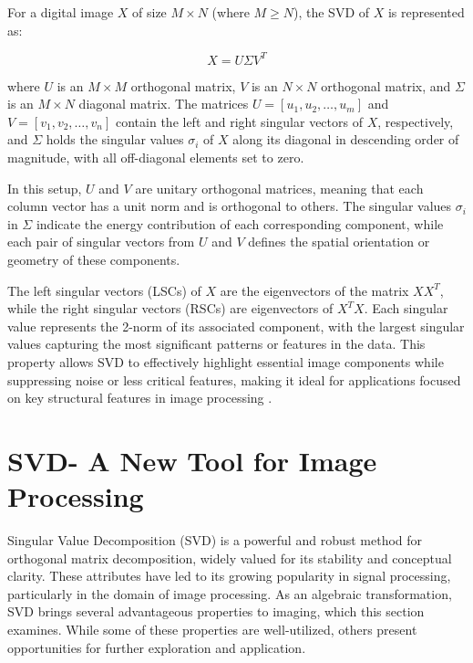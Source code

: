 \documentclass[
  journal,
]{IEEEtran}%
\begin{document}
For a digital image \(X\) of size \(M \times N\) (where \(M \geq N\)),
the SVD of \(X\) is represented as:

\[
X = U \Sigma V^T
\]

where \(U\) is an \(M \times M\) orthogonal matrix, \(V\) is an
\(N \times N\) orthogonal matrix, and \(\Sigma\) is an \(M \times N\)
diagonal matrix. The matrices \(U = [u_1, u_2, \ldots, u_m]\) and
\(V = [v_1, v_2, \ldots, v_n]\) contain the left and right singular
vectors of \(X\), respectively, and \(\Sigma\) holds the singular values
\(\sigma_i\) of \(X\) along its diagonal in descending order of
magnitude, with all off-diagonal elements set to zero.

In this setup, \(U\) and \(V\) are unitary orthogonal matrices, meaning
that each column vector has a unit norm and is orthogonal to others. The
singular values \(\sigma_i\) in \(\Sigma\) indicate the energy
contribution of each corresponding component, while each pair of
singular vectors from \(U\) and \(V\) defines the spatial orientation or
geometry of these components.

The left singular vectors (LSCs) of \(X\) are the eigenvectors of the
matrix \(X X^T\), while the right singular vectors (RSCs) are
eigenvectors of \(X^T X\). Each singular value represents the 2-norm of
its associated component, with the largest singular values capturing the
most significant patterns or features in the data. This property allows
SVD to effectively highlight essential image components while
suppressing noise or less critical features, making it ideal for
applications focused on key structural features in image processing
.

\section{SVD- A New Tool for Image
Processing}\label{svd--a-new-tool-for-image-processing}

Singular Value Decomposition (SVD) is a powerful and robust method for
orthogonal matrix decomposition, widely valued for its stability and
conceptual clarity. These attributes have led to its growing popularity
in signal processing, particularly in the domain of image processing. As
an algebraic transformation, SVD brings several advantageous properties
to imaging, which this section examines. While some of these properties
are well-utilized, others present opportunities for further exploration
and application.
\end{document}
